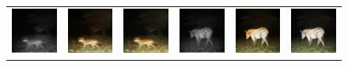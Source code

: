 \begin{figure}[htp!]
\begin{tabularx}{\textwidth}{Y Y Y !{\space} Y Y Y}
        \includegraphics{gfx/conditional-with-cycle-gan-qual/nir_S2_B06_R1_PICT0128.jpg} & \includegraphics{gfx/conditional-with-cycle-gan-qual/cyclegan_S2_B06_R1_PICT0128_fake.png} & \includegraphics{gfx/conditional-with-cycle-gan-qual/diff_cycle_gan_S2_B06_R1_PICT0128_fake.png} & \includegraphics{gfx/conditional-with-cycle-gan-qual/nir_S2_B06_R1_PICT0279.jpg} & \includegraphics{gfx/conditional-with-cycle-gan-qual/cyclegan_S2_B06_R1_PICT0279_fake.png} & \includegraphics{gfx/conditional-with-cycle-gan-qual/diff_cycle_gan_S2_B06_R1_PICT0279_fake.png} \\

\end{tabularx}
\end{figure}
